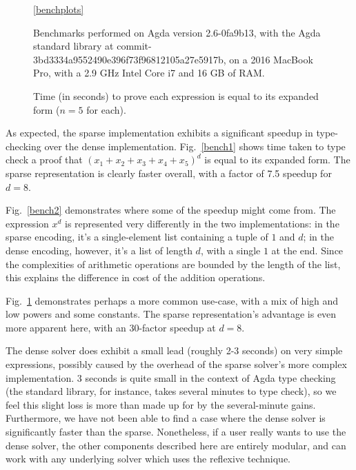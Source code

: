 \documentclass[acmsmall,review,anonymous]{acmart}\settopmatter{printfolios=true,printccs=false,printacmref=false}
\begin{document}
\begin{figure}
\begin{subfigure}[t]{0.3\textwidth}
    \label{bench3}
  \end{subfigure}
  \ref{benchplots}
  \parbox{0.9\textwidth}{
    \begin{flushleft}
      \caption{Time (in seconds) to prove each expression is equal to its expanded
        form ($n = 5$ for each).}
      \smallskip
      \footnotesize
      Benchmarks performed on Agda version 2.6-0fa9b13, with the Agda standard
      library at commit-3bd3334a9552490e396f73f96812105a27e5917b, on a 2016
      MacBook Pro, with a 2.9 GHz Intel Core i7 and 16 GB of RAM.
    \end{flushleft}
  }
  \label{benchmarks}
\end{figure}
As expected, the sparse implementation exhibits a significant speedup in
type-checking over the dense implementation. Fig.~\ref{bench1}
shows time taken to type check a proof that \((x_1 + x_2 + x_3 + x_4 + x_5)^d\)
is equal to its expanded form. The sparse representation is clearly faster
overall, with a factor of 7.5 speedup for \(d = 8\).

Fig.~\ref{bench2} demonstrates where some of the speedup might come
from. The expression \(x^d\) is represented very differently in the two
implementations: in the sparse encoding, it's a single-element list containing a
tuple of $1$ and $d$; in the dense encoding, however, it's a list of length $d$,
with a single $1$ at the end. Since the complexities of arithmetic operations
are bounded by the length of the list, this explains the difference in cost of
the addition operations.

Fig.~\ref{bench3} demonstrates perhaps a more common use-case, with a mix of
high and low powers and some constants. The sparse representation's advantage is
even more apparent here, with an \(30\)-factor speedup at \(d = 8\).

The dense solver does exhibit a small lead (roughly 2-3 seconds) on very simple
expressions, possibly caused by the overhead of the sparse solver's more complex
implementation. 3 seconds is quite small in the context of Agda type checking
(the standard library, for instance, takes several minutes to type check), so we
feel this slight loss is more than made up for by the several-minute gains.
Furthermore, we have not been able to find a case where the dense solver is
significantly faster than the sparse. Nonetheless, if a user really wants to use
the dense solver, the other components described here are entirely modular, and
can work with any underlying solver which uses the reflexive technique.
\end{document}
